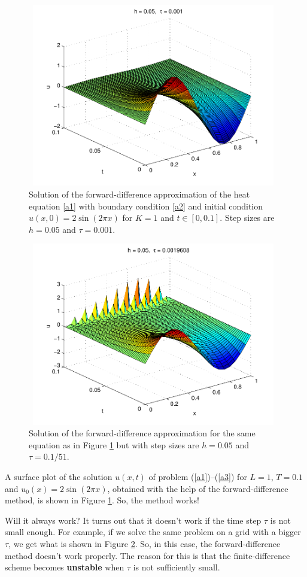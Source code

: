 {{\begin{figure}[h]
\includegraphics[width=11cm,height=8cm]{forward_diff_fig1.pdf}
\caption{Solution of the forward-difference approximation of the heat equation 
\eqref{a1} with boundary condition \eqref{a2} and initial condition $u(x,0)=2\sin(2\pi x)$ for
$K=1$ and $t\in[0,0.1]$. Step sizes are $h=0.05$ and $\tau=0.001$.}
\label{fig2}
\end{figure}

\begin{figure}[h]
\centering
\includegraphics[width=11cm,height=8cm]{forward_diff_fig2.pdf}
\caption{Solution of the forward-difference approximation for the same
equation as in Figure \ref{fig2} but with step sizes are $h=0.05$ and $\tau=0.1/51$.}
\label{fig3}
\end{figure}
A surface plot of the solution $u(x,t)$ of problem (\ref{a1})--(\ref{a3}) for $L=1$, $T=0.1$
and $u_{0}(x)=2 \sin(2\pi x)$, obtained with the help of the forward-difference
method, is shown in Figure \ref{fig2}. So, the method works!

Will it always work? It turns out that it doesn't work if the time step $\tau$ is not small enough.
For example, if we solve the same problem on a grid with a bigger $\tau$, we get what is shown in Figure \ref{fig3}.
So, in this case, the forward-difference method doesn't work properly. The reason for this is that
the finite-difference scheme becomes \textbf{unstable} when $\tau$ is not sufficiently small.


}}
